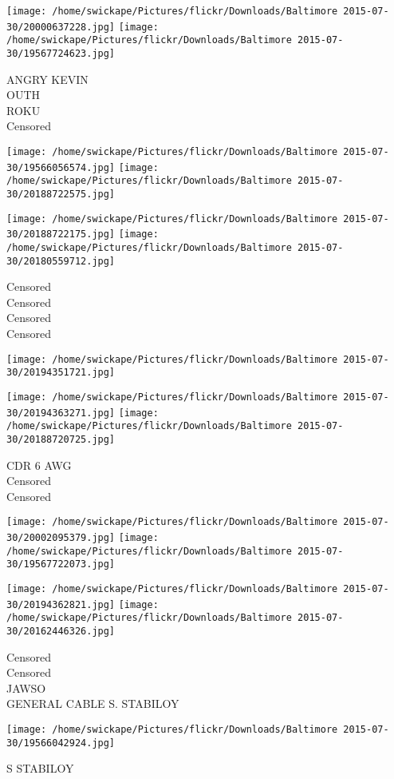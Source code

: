 \documentclass[10pt,letterpaper]{article}
\begin{document}
\texttt{[image: /home/swickape/Pictures/flickr/Downloads/Baltimore 2015-07-30/20000637228.jpg]}
\texttt{[image: /home/swickape/Pictures/flickr/Downloads/Baltimore 2015-07-30/19567724623.jpg]}

ANGRY KEVIN\\
OUTH\\
ROKU\\
Censored\\
\pagebreak

\texttt{[image: /home/swickape/Pictures/flickr/Downloads/Baltimore 2015-07-30/19566056574.jpg]}
\texttt{[image: /home/swickape/Pictures/flickr/Downloads/Baltimore 2015-07-30/20188722575.jpg]}

\texttt{[image: /home/swickape/Pictures/flickr/Downloads/Baltimore 2015-07-30/20188722175.jpg]}
\texttt{[image: /home/swickape/Pictures/flickr/Downloads/Baltimore 2015-07-30/20180559712.jpg]}

Censored\\
Censored\\
Censored\\
Censored\\
\pagebreak

\texttt{[image: /home/swickape/Pictures/flickr/Downloads/Baltimore 2015-07-30/20194351721.jpg]}

\vspace{0.25in}
\texttt{[image: /home/swickape/Pictures/flickr/Downloads/Baltimore 2015-07-30/20194363271.jpg]}
\texttt{[image: /home/swickape/Pictures/flickr/Downloads/Baltimore 2015-07-30/20188720725.jpg]}

CDR 6 AWG\\
Censored\\
Censored\\
\pagebreak

\texttt{[image: /home/swickape/Pictures/flickr/Downloads/Baltimore 2015-07-30/20002095379.jpg]}
\texttt{[image: /home/swickape/Pictures/flickr/Downloads/Baltimore 2015-07-30/19567722073.jpg]}

\texttt{[image: /home/swickape/Pictures/flickr/Downloads/Baltimore 2015-07-30/20194362821.jpg]}
\texttt{[image: /home/swickape/Pictures/flickr/Downloads/Baltimore 2015-07-30/20162446326.jpg]}

Censored\\
Censored\\
JAWSO\\
GENERAL CABLE S. STABILOY\\
\pagebreak

\texttt{[image: /home/swickape/Pictures/flickr/Downloads/Baltimore 2015-07-30/19566042924.jpg]}

S STABILOY\\
\pagebreak
\end{document}
